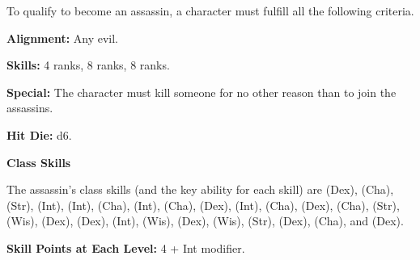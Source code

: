 
\Requirements

To qualify to become an assassin, a character must fulfill all the following criteria.

\textbf{Alignment:} Any evil.

\textbf{Skills:}  4 ranks,  8 ranks,  8 ranks.

\textbf{Special:} The character must kill someone for no other reason than to join 
the assassins.

\Basics

\textbf{Hit Die:} d6.

\textbf{Class Skills}

The assassin's class skills (and the key ability for each skill) are  (Dex), 
 (Cha),  (Str),  (Int),  (Int),  (Cha), 
 (Int),  (Cha),  (Dex),  (Int),
 (Cha),  (Dex),  (Cha),  (Str),  (Wis),  (Dex),  (Dex),  (Int),  (Wis),  
(Dex),  (Wis),  (Str),  (Dex),  (Cha), and  
(Dex). 

\textbf{Skill Points at Each Level:} 4 + Int modifier.

